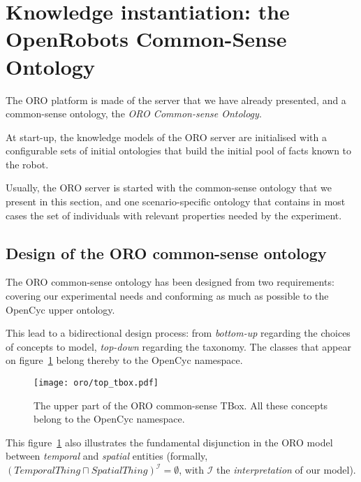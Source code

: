 
\section{Knowledge instantiation: the OpenRobots Common-Sense Ontology}

The ORO platform is made of the server that we have already presented, and a
common-sense ontology, the \emph{ORO Common-sense Ontology}.

At start-up, the knowledge models of the ORO server are initialised with a
configurable sets of initial ontologies that build the initial pool of facts
known to the robot.

Usually, the ORO server is started with the common-sense ontology that we
present in this section, and one scenario-specific ontology that contains in
most cases the set of individuals with relevant properties needed by the
experiment.

\subsection{Design of the ORO common-sense ontology}
\label{sect|commonsense-design}

The ORO common-sense ontology has been designed from two requirements: covering
our experimental needs and conforming as much as possible to the {\sc OpenCyc}
upper ontology.

This lead to a bidirectional design process: from \emph{bottom-up} regarding
the choices of concepts to model, \emph{top-down} regarding the taxonomy. The
classes that appear on figure~\ref{fig|upper_tbox} belong thereby to the {\sc
OpenCyc} namespace.

\begin{figure}
    \centering
    \texttt{[image: oro/top\_tbox.pdf]}

    \caption{The upper part of the ORO common-sense TBox. All these concepts
    belong to the {\sc OpenCyc} namespace.}
    
    \label{fig|upper_tbox}
\end{figure}

This figure~\ref{fig|upper_tbox} also illustrates the fundamental disjunction
in the ORO model between \emph{temporal} and \emph{spatial} entities (formally,
$(TemporalThing \sqcap SpatialThing)^{\mathcal{I}} = \emptyset$, with
$\mathcal{I}$ the \emph{interpretation} of our model).

